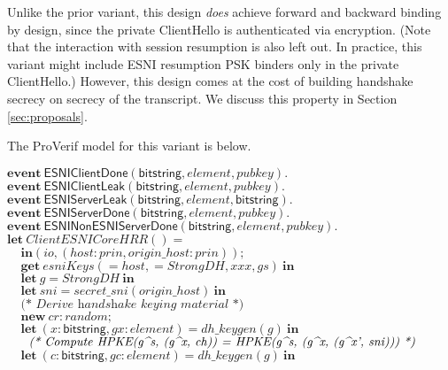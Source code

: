 \documentclass{article}
\theoremstyle{definition}
\newcommand{\kwl}[1]{\mathbf{#1}}
\newcommand{\kwt}[1]{\mathsf{#1}}
\newcommand{\kwe}[1]{\mathsf{#1}}
\newcommand{\var}[1]{\mathit{#1}}
\theoremstyle{definition}
\begin{document}
Unlike the prior variant, this design \emph{does} achieve forward and backward binding by
design, since the private ClientHello is authenticated via encryption. (Note that the interaction
with session resumption is also left out. In practice, this variant might include ESNI 
resumption PSK binders only in the private ClientHello.) However, this design comes at the cost
of building handshake secrecy on secrecy of the transcript. We discuss this property in Section \ref{sec:proposals}.

The ProVerif model for this variant is below.

\begin{tabbing}
$\kwl{event}\ \kwe{ESNIClientDone}(\kwt{bitstring}, \var{element}, \var{pubkey}). $\\
$\kwl{event}\ \kwe{ESNIClientLeak}(\kwt{bitstring}, \var{element}, \var{pubkey}). $\\
$\kwl{event}\ \kwe{ESNIServerLeak}(\kwt{bitstring}, \var{element}, \kwt{bitstring}). $\\
$\kwl{event}\ \kwe{ESNIServerDone}(\kwt{bitstring}, \var{element}, \var{pubkey}). $\\
$\kwl{event}\ \kwe{ESNINonESNIServerDone}(\kwt{bitstring}, \var{element}, \var{pubkey}). $\\
$ $\\
$\kwl{let}\ \var{ClientESNICoreHRR}() =  $\\
$\ \ \ \ \ \kwl{in}(\var{io}, (\var{host}{:}\var{prin}, \var{origin{\_}host}{:}\var{prin})); $\\
$\ \ \ \ \ \kwl{get}\ \var{esniKeys}( = \var{host},  = \var{StrongDH}, \var{xxx}, \var{gs})\ \kwl{in} $\\
$\ \ \ \ \ \kwl{let}\ \var{g} = \var{StrongDH}\ \kwl{in} $\\
$\ \ \ \ \ \kwl{let}\ \var{sni} = \var{secret{\_}sni}(\var{origin{\_}host})\ \kwl{in} $\\
$ $\\
$\ \ \ \ \ \textit{(* Derive handshake keying material *)} $\\
$\ \ \ \ \ \kwl{new}\ \var{cr}{:}\var{random}; $\\
$\ \ \ \ \ \kwl{let}\ (\var{x}{:}\kwt{bitstring}, \var{gx}{:}\var{element}) = \var{dh{\_}keygen}(\var{g})\ \kwl{in} $\\
$ $\\
$\ \ \ \ \ \textit{(* Compute HPKE(g{\string^}s, (g{\string^}x, ch)) = HPKE(g{\string^}s, (g{\string^}x, (g{\string^}x', sni)))  *)} $\\
$\ \ \ \ \ \kwl{let}\ (\var{c}{:}\kwt{bitstring}, \var{gc}{:}\var{element}) = \var{dh{\_}keygen}(\var{g})\ \kwl{in} $\\

\end{tabbing}
\end{document}
